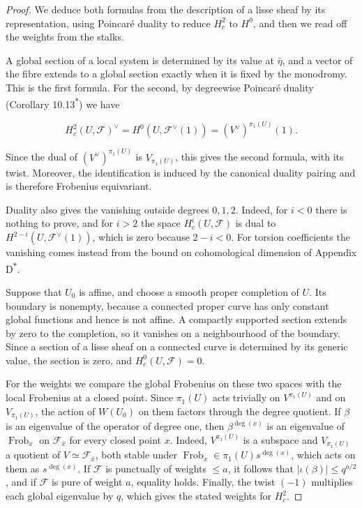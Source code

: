 \documentclass[11pt]{article}
\newcommand{\bpout}[1]{#1\textsuperscript{\hyperlink{bp-outside}{\ensuremath{\ast}}}}
\begin{document}
\begin{proof}[{Proof}]\label{bp67}%
We deduce both formulas from the description of a lisse sheaf by its representation, using Poincaré duality to reduce \(H^2_c\) to \(H^0\), and then we read off the weights from the stalks.

A global section of a local system is determined by its value at \(\bar\eta\), and a vector of the fibre extends to a global section exactly when it is fixed by the monodromy. This is the first formula.  For the second, by degreewise Poincaré duality (Corollary \bpout{10.13}) we have

\[
H_c^2(U,\mathcal F)^\vee
=H^0(U,\mathcal F^\vee(1))=(V^\vee)^{\pi_1(U)}(1).
\]

Since the dual of \((V^\vee)^{\pi_1(U)}\) is \(V_{\pi_1(U)}\), this gives the second formula, with its twist. Moreover, the identification is induced by the canonical duality pairing and is therefore Frobenius equivariant.

Duality also gives the vanishing outside degrees \(0,1,2\). Indeed, for \(i<0\) there is nothing to prove, and for \(i>2\) the space \(H_c^i(U,\mathcal F)\) is dual to \(H^{2-i}(U,\mathcal F^\vee(1))\), which is zero because \(2-i<0\). For torsion coefficients the vanishing comes instead from the bound on cohomological dimension of Appendix \bpout{D}.

Suppose that \(U_0\) is affine, and choose a smooth proper completion of \(U\). Its boundary is nonempty, because a connected proper curve has only constant global functions and hence is not affine. A compactly supported section extends by zero to the completion, so it vanishes on a neighbourhood of the boundary. Since a section of a lisse sheaf on a connected curve is determined by its generic value, the section is zero, and \(H_c^0(U,\mathcal F)=0\).

For the weights we compare the global Frobenius on these two spaces with the local Frobenius at a closed point. Since \(\pi_1(U)\) acts trivially on \(V^{\pi_1(U)}\) and on \(V_{\pi_1(U)}\), the action of \(W(U_0)\) on them factors through the degree quotient.  If \(\beta\) is an eigenvalue of the operator of degree one, then \(\beta^{\deg(x)}\) is an eigenvalue of \(\operatorname{Frob}_x\) on \(\mathcal F_{\bar x}\) for every closed point \(x\). Indeed, \(V^{\pi_1(U)}\) is a subspace and \(V_{\pi_1(U)}\) a quotient of \(V\simeq\mathcal F_{\bar x}\), both stable under \(\operatorname{Frob}_x\in\pi_1(U)s^{\deg(x)}\), which acts on them as \(s^{\deg(x)}\).  If \(\mathcal F\) is punctually of weights \(\le a\), it follows that \(|\iota(\beta)|\le q^{a/2}\), and if \(\mathcal F\) is pure of weight \(a\), equality holds. Finally, the twist \((-1)\) multiplies each global eigenvalue by \(q\), which gives the stated weights for \(H_c^2\).
\end{proof}
\end{document}

